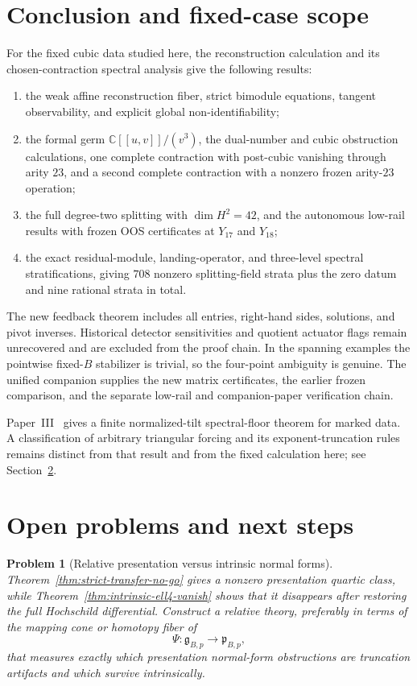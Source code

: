 \documentclass[11pt]{amsart}
\newtheorem{problem}[theorem]{Problem}
\newcommand{\C}{\mathbb C}
\newcommand{\gpres}{\mathfrak p}
\newcommand{\ghoch}{\mathfrak g}
\begin{document}
\section{Conclusion and fixed-case scope}\label{sec:fixed-case-conclusion}
For the fixed cubic data studied here, the reconstruction calculation and its
chosen-contraction spectral analysis give the following results:
\begin{enumerate}[label=(\roman*)]
\item the weak affine reconstruction fiber, strict bimodule equations, tangent observability, and explicit global non-identifiability;
\item the formal germ $\C[[u,v]]/(v^3)$, the dual-number and cubic obstruction
calculations, one complete contraction with post-cubic vanishing through arity
$23$, and a second complete contraction with a nonzero frozen arity-$23$ operation;
\item the full degree-two splitting with $\dim H^2=42$, and the autonomous
low-rail results with frozen OOS certificates at $Y_{17}$ and $Y_{18}$;
\item the exact residual-module, landing-operator, and three-level spectral stratifications, giving $708$ nonzero splitting-field strata plus the zero datum and nine rational strata in total.
\end{enumerate}
The new feedback theorem includes all entries, right-hand sides, solutions, and
pivot inverses. Historical detector sensitivities and quotient actuator flags
remain unrecovered and are excluded from the proof chain. In the
spanning examples the pointwise fixed-$B$ stabilizer is trivial, so the four-point
ambiguity is genuine. The unified companion supplies the new matrix certificates, the earlier frozen
comparison, and the separate low-rail and companion-paper verification chain.

Paper~III~\cite{PaperIII} gives a finite normalized-tilt spectral-floor theorem for marked
data. A classification of arbitrary triangular forcing and its exponent-truncation rules
remains distinct from that result and from the fixed calculation here; see
Section~\ref{sec:open-problems}.

\section{Open problems and next steps}\label{sec:open-problems}

\begin{problem}[Relative presentation versus intrinsic normal forms]
Theorem~\ref{thm:strict-transfer-no-go} gives a nonzero presentation quartic class, while Theorem~\ref{thm:intrinsic-ell4-vanish} shows that it disappears after restoring the full Hochschild differential.  Construct a relative theory, preferably in terms of the mapping cone or homotopy fiber of
\[
\Psi:\ghoch_{B,p}\to\gpres_{B,p},
\]
that measures exactly which presentation normal-form obstructions are truncation artifacts and which survive intrinsically.
\end{problem}
\end{document}
